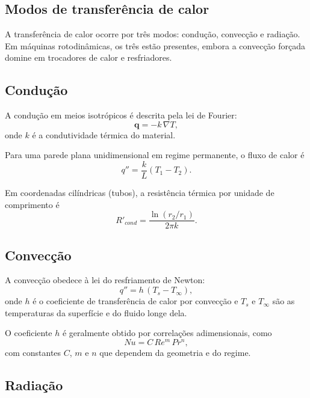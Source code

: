 \documentclass[12pt,a4paper]{article}
\numberwithin{equation}{section}
\numberwithin{table}{section}
\numberwithin{figure}{section}
\begin{document}
\subsection{Modos de transferência de calor}

A transferência de calor ocorre por três modos: condução, convecção e
radiação. Em máquinas rotodinâmicas, os três estão presentes, embora a
convecção forçada domine em trocadores de calor e resfriadores.

\subsection{Condução}

A condução em meios isotrópicos é descrita pela lei de Fourier:
\begin{equation}\label{eq:v1-c5-1}
\mathbf{q} = -k \, \nabla T,
\end{equation}
onde $k$ é a condutividade térmica do material.

Para uma parede plana unidimensional em regime permanente, o fluxo de calor é
\begin{equation}\label{eq:v1-c5-2}
q'' = \frac{k}{L}(T_1 - T_2).
\end{equation}

Em coordenadas cilíndricas (tubos), a resistência térmica por unidade de
comprimento é
\begin{equation}\label{eq:v1-c5-3}
R'_{cond} = \frac{\ln(r_2/r_1)}{2\pi k}.
\end{equation}

\subsection{Convecção}

A convecção obedece à lei do resfriamento de Newton:
\begin{equation}\label{eq:v1-c5-4}
q'' = h\,(T_s - T_\infty),
\end{equation}
onde $h$ é o coeficiente de transferência de calor por convecção e $T_s$ e
$T_\infty$ são as temperaturas da superfície e do fluido longe dela.

O coeficiente $h$ é geralmente obtido por correlações adimensionais, como
\begin{equation}\label{eq:v1-c5-5}
Nu = C \, Re^m \, Pr^n,
\end{equation}
com constantes $C$, $m$ e $n$ que dependem da geometria e do regime.

\subsection{Radiação}
\end{document}
